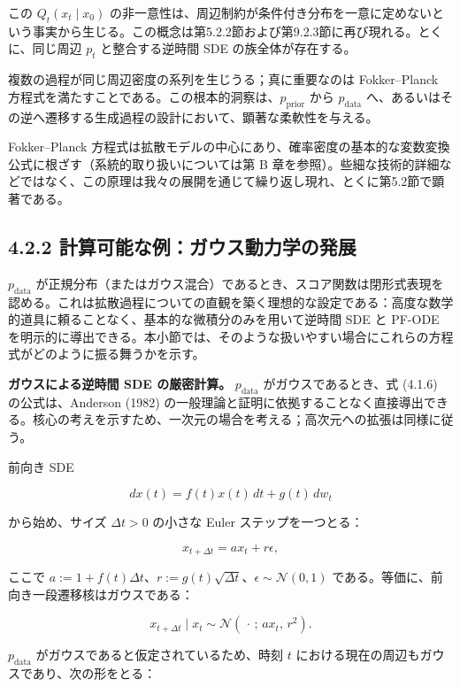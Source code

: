 この $Q_t(x_t\mid x_0)$ の非一意性は、周辺制約が条件付き分布を一意に定めないという事実から生じる。この概念は第5.2.2節および第9.2.3節に再び現れる。とくに、同じ周辺 $p_t$ と整合する逆時間 SDE の族全体が存在する。

\begin{propositionbox}[観察 4.2.1: 規定された周辺密度の整合]
複数の過程が同じ周辺密度の系列を生じうる；真に重要なのは Fokker–Planck 方程式を満たすことである。この根本的洞察は、$p_{\mathrm{prior}}$ から $p_{\mathrm{data}}$ へ、あるいはその逆へ遷移する生成過程の設計において、顕著な柔軟性を与える。
\end{propositionbox}


Fokker–Planck 方程式は拡散モデルの中心にあり、確率密度の基本的な変数変換公式に根ざす（系統的取り扱いについては第 B 章を参照）。些細な技術的詳細などではなく、この原理は我々の展開を通じて繰り返し現れ、とくに第5.2節で顕著である。


\subsection*{4.2.2 計算可能な例：ガウス動力学の発展}


$p_{\mathrm{data}}$ が正規分布（またはガウス混合）であるとき、スコア関数は閉形式表現を認める。これは拡散過程についての直観を築く理想的な設定である：高度な数学的道具に頼ることなく、基本的な微積分のみを用いて逆時間 SDE と PF-ODE を明示的に導出できる。本小節では、そのような扱いやすい場合にこれらの方程式がどのように振る舞うかを示す。

\textbf{ガウスによる逆時間 SDE の厳密計算。} $p_{\mathrm{data}}$ がガウスであるとき、式 (4.1.6) の公式は、Anderson (1982) の一般理論と証明に依拠することなく直接導出できる。核心の考えを示すため、一次元の場合を考える；高次元への拡張は同様に従う。

前向き SDE

\[
dx(t)=f(t)x(t)\,dt + g(t)\,dw_t
\]


から始め、サイズ $\Delta t>0$ の小さな Euler ステップを一つとる：

\[
x_{t+\Delta t}=a x_t + r\epsilon,
\]


ここで $a:=1+f(t)\Delta t$、$r:=g(t)\sqrt{\Delta t}$、$\epsilon\sim\mathcal{N}(0,1)$ である。等価に、前向き一段遷移核はガウスである：

\[
x_{t+\Delta t}\mid x_t \sim \mathcal{N}(\,\cdot\,;\, a x_t,\, r^2).
\]


$p_{\mathrm{data}}$ がガウスであると仮定されているため、時刻 $t$ における現在の周辺もガウスであり、次の形をとる：

